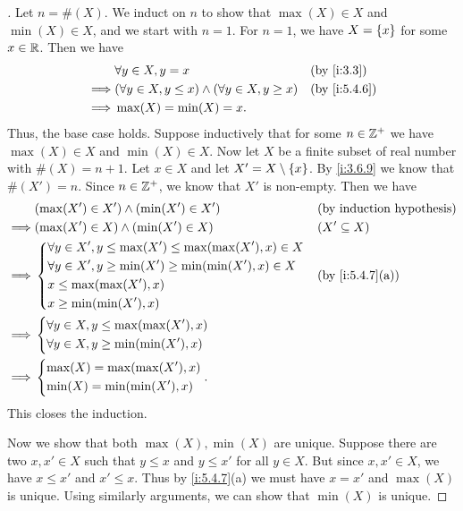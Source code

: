 \begin{proof}[]
  Let \(n = \#(X)\).
  We induct on \(n\) to show that \(\max(X) \in X\) and \(\min(X) \in X\), and we start with \(n = 1\).
  For \(n = 1\), we have \(X = \left\lbrace x\right\rbrace\) for some \(x \in \mathbb{R}\).
  Then we have
  \begin{align*}
             & \forall y \in X, y = x                                        &  & \by{i:3.3}   \\
    \implies & (\forall y \in X, y \leq x) \land (\forall y \in X, y \geq x) &  & \by{i:5.4.6} \\
    \implies & \max(X) = \min(X) = x.
  \end{align*}
  Thus, the base case holds.
  Suppose inductively that for some \(n \in \mathbb{Z}^+\) we have \(\max(X) \in X\) and \(\min(X) \in X\).
  Now let \(X\) be a finite subset of real number with \(\#(X) = n + 1\).
  Let \(x \in X\) and let \(X' = X \setminus \left\lbrace x\right\rbrace\).
  By \cref{i:3.6.9} we know that \(\#(X') = n\).
  Since \(n \in \mathbb{Z}^+\), we know that \(X'\) is non-empty.
  Then we have
  \begin{align*}
             & (\max(X') \in X') \land (\min(X') \in X')                         &  & \byIH            \\
    \implies & (\max(X') \in X) \land (\min(X') \in X)                           &  & (X' \subseteq X) \\
    \implies & \begin{dcases}
                 \forall y \in X', y \leq \max(X') \leq \max(\max(X'), x) \in X \\
                 \forall y \in X', y \geq \min(X') \geq \min(\min(X'), x) \in X \\
                 x \leq \max(\max(X'), x)                                       \\
                 x \geq \min(\min(X'), x)
               \end{dcases} &  & \by{i:5.4.7}[a]                          \\
    \implies & \begin{dcases}
                 \forall y \in X, y \leq \max(\max(X'), x) \\
                 \forall y \in X, y \geq \min(\min(X'), x)
               \end{dcases}                                               \\
    \implies & \begin{dcases}
                 \max(X) = \max(\max(X'), x) \\
                 \min(X) = \min(\min(X'), x)
               \end{dcases}.
  \end{align*}
  This closes the induction.

  Now we show that both \(\max(X), \min(X)\) are unique.
  Suppose there are two \(x, x' \in X\) such that \(y \leq x\) and \(y \leq x'\) for all \(y \in X\).
  But since \(x, x' \in X\), we have \(x \leq x'\) and \(x' \leq x\).
  Thus by \cref{i:5.4.7}(a) we must have \(x = x'\) and \(\max(X)\) is unique.
  Using similarly arguments, we can show that \(\min(X)\) is unique.
\end{proof}

